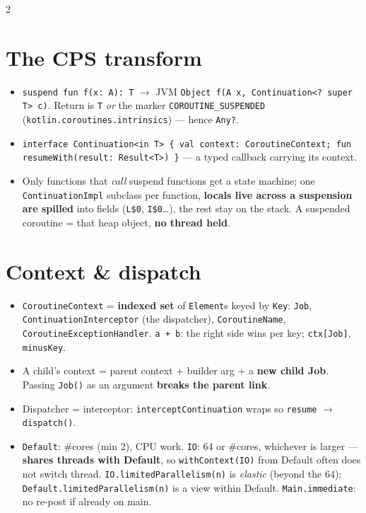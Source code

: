 \documentclass[8pt]{extarticle}
\begin{document}
\begin{multicols}{2}
\raggedright

\section{The CPS transform}
\begin{itemize}\raggedright
  \item \texttt{suspend fun f(x: A): T} $\to$ JVM \texttt{Object f(A x, Continuation<? super T> c)}.
        Return is \texttt{T} \emph{or} the marker \texttt{COROUTINE\_SUSPENDED}
        (\texttt{kotlin.coroutines.intrinsics}) — hence \texttt{Any?}.
  \item \texttt{interface Continuation<in T> \{ val context: CoroutineContext;
        fun resumeWith(result: Result<T>) \}} — a typed callback carrying its context.
  \item Only functions that \emph{call} suspend functions get a state machine; one
        \texttt{ContinuationImpl} subclass per function, \textbf{locals live across a
        suspension are spilled} into fields (\texttt{L\$0}, \texttt{I\$0}…\unverified), the rest stay on
        the stack. A suspended coroutine = that heap object, \textbf{no thread held}.
\end{itemize}

\section{Context \& dispatch}
\begin{itemize}\raggedright
  \item \texttt{CoroutineContext} = \textbf{indexed set} of \texttt{Element}s keyed by
        \texttt{Key}: \texttt{Job}, \texttt{ContinuationInterceptor} (the dispatcher),
        \texttt{CoroutineName}, \texttt{CoroutineExceptionHandler}. \texttt{a + b}: the right
        side wins per key; \texttt{ctx[Job]}, \texttt{minusKey}.
  \item A child's context = parent context + builder arg + a \textbf{new child Job}.
        Passing \texttt{Job()} as an argument \textbf{breaks the parent link}.
  \item Dispatcher = interceptor: \texttt{interceptContinuation} wraps so \texttt{resume}
        $\to$ \texttt{dispatch()}.
  \item \texttt{Default}: \#cores (min 2), CPU work. \texttt{IO}: 64 or \#cores, whichever is
        larger — \textbf{shares threads with Default}, so \texttt{withContext(IO)} from Default
        often does not switch thread. \texttt{IO.limitedParallelism(n)} is \emph{elastic}
        (beyond the 64); \texttt{Default.limitedParallelism(n)} is a view within Default.
        \texttt{Main.immediate}: no re-post if already on main.
\end{itemize}


\end{multicols}
\end{document}
